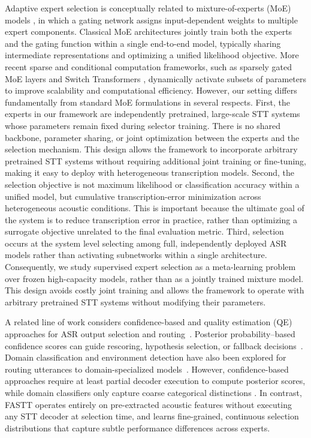\documentclass[journal]{IEEEtran}
\begin{document}
Adaptive expert selection is conceptually related to mixture-of-experts (MoE) models \cite{jacobs1991_moe,shazeer2017outrageously,fedus2022_switch,you2021_speechmoe}, in which a gating network assigns input-dependent weights to multiple expert components. Classical MoE architectures jointly train both the experts and the gating function within a single end-to-end model, typically sharing intermediate representations and optimizing a unified likelihood objective. More recent sparse and conditional computation frameworks, such as sparsely gated MoE layers and Switch Transformers \cite{shazeer2017outrageously, fedus2022_switch}, dynamically activate subsets of parameters to improve scalability and computational efficiency. However, our setting differs fundamentally from standard MoE formulations in several respects. First, the experts in our framework are independently pretrained, large-scale STT systems whose parameters remain fixed during selector training. There is no shared backbone, parameter sharing, or joint optimization between the experts and the selection mechanism. This
design allows the framework to incorporate arbitrary pretrained STT
systems without requiring additional joint training or fine-tuning,
making it easy to deploy with heterogeneous transcription models. Second, the selection objective is not maximum likelihood or
classification accuracy within a unified model, but cumulative
transcription-error minimization across heterogeneous acoustic
conditions. This is important because the ultimate goal of the system
is to reduce transcription error in practice, rather than optimizing a surrogate objective unrelated to the final evaluation metric. Third, selection occurs at the system level selecting among full, independently deployed ASR models rather than activating subnetworks within a single architecture. Consequently, we study supervised expert selection as a meta-learning problem over frozen high-capacity models, rather than as a jointly trained mixture model. This design avoids costly joint training and
allows the framework to operate with arbitrary pretrained STT systems
without modifying their parameters.

A related line of work considers confidence-based and quality estimation (QE)
approaches for ASR output selection and routing~\cite{kastanos,li2021_conf_seq2seq}. Posterior probability--based
confidence scores can guide rescoring, hypothesis selection, or fallback
decisions~\cite{kastanos,mangu2000finding,ravi2024_teles_confidence,li2021_conf_seq2seq}. Domain classification and environment
detection have also been explored for routing utterances to domain-specialized
models~\cite{gitman2023confidence_ensembles,you2022_speechmoe2,kwon2023_mole}. However, confidence-based approaches require at
least partial decoder execution to compute posterior scores, while domain
classifiers only capture coarse categorical distinctions \cite{kastanos,mangu2000finding,gitman2023confidence_ensembles,li2021_conf_seq2seq}. In contrast, FASTT
operates entirely on pre-extracted acoustic features without executing any
STT decoder at selection time, and learns fine-grained, continuous selection
distributions that capture subtle performance differences across experts.
\end{document}
